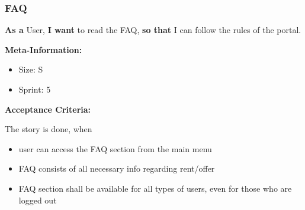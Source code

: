 \subsubsection{FAQ}

\textbf{As a} User,\hfill\break
\textbf{I want} to read the FAQ,\hfill\break
\textbf{so that} I can follow the rules of the portal.

\textbf{Meta-Information:}
\begin{itemize}
    \item Size: S
    \item Sprint: 5
\end{itemize}

\textbf{Acceptance Criteria:}

The story is done, when
\begin{itemize}
    \item user can access the FAQ section from the main menu
    \item FAQ consists of all necessary info regarding rent/offer
    \item FAQ section shall be available for all types of users, even for those who are logged out
\end{itemize}
